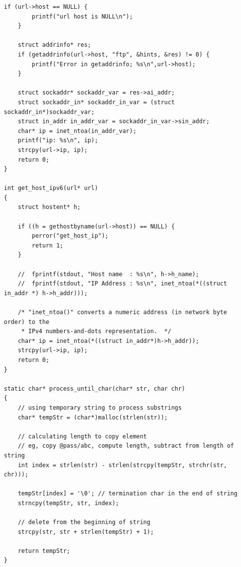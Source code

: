 \documentclass[a4paper,11pt,titlepage]{article}
\begin{document}
\begin{lstlisting}[style=customcwithlines]
    if (url->host == NULL) {
        printf("url host is NULL\n");
    }

    struct addrinfo* res;
    if (getaddrinfo(url->host, "ftp", &hints, &res) != 0) {
        printf("Error in getaddrinfo; %s\n",url->host);
    }

    struct sockaddr* sockaddr_var = res->ai_addr;
    struct sockaddr_in* sockaddr_in_var = (struct sockaddr_in*)sockaddr_var;
    struct in_addr in_addr_var = sockaddr_in_var->sin_addr;
    char* ip = inet_ntoa(in_addr_var);
    printf("ip: %s\n", ip);
    strcpy(url->ip, ip);
    return 0;
}

int get_host_ipv6(url* url)
{
    struct hostent* h;

    if ((h = gethostbyname(url->host)) == NULL) {
        perror("get_host_ip");
        return 1;
    }

    //	fprintf(stdout, "Host name  : %s\n", h->h_name);
    //	fprintf(stdout, "IP Address : %s\n", inet_ntoa(*((struct in_addr *) h->h_addr)));

    /* "inet_ntoa()" converts a numeric address (in network byte order) to the
     * IPv4 numbers-and-dots representation.  */
    char* ip = inet_ntoa(*((struct in_addr*)h->h_addr));
    strcpy(url->ip, ip);
    return 0;
}

static char* process_until_char(char* str, char chr)
{
    // using temporary string to process substrings
    char* tempStr = (char*)malloc(strlen(str));

    // calculating length to copy element
    // eg, copy @pass/abc, compute length, subtract from length of string
    int index = strlen(str) - strlen(strcpy(tempStr, strchr(str, chr)));

    tempStr[index] = '\0'; // termination char in the end of string
    strncpy(tempStr, str, index);

    // delete from the beginning of string
    strcpy(str, str + strlen(tempStr) + 1);

    return tempStr;
}
\end{lstlisting}
\end{document}
